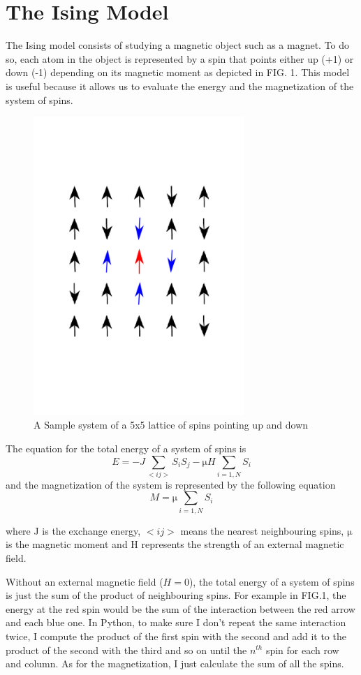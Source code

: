 \documentclass[aps,twocolumn,twoside,secnumarabic,balancelastpage,amsmath,amssymb,nofootinbib,hyperref=pdftex]{revtex4}
\begin{document}
\section{The Ising Model}
The Ising model consists of studying a magnetic object such as a magnet. To do so, each atom in the object is represented by a spin that points either up (+1) or down (-1) depending on its magnetic moment as depicted in FIG. 1. This model is useful because it allows us to evaluate the energy and the magnetization of the system of spins.
\begin{figure}[htb]
\includegraphics[width=8cm]{myspins.png}	
\caption{ A Sample system of a 5x5 lattice of spins pointing up and down}
\end{figure}

The equation for the total energy of a system of spins is 
\begin{equation}
   E= -J\sum_{<ij>} S_i S_j - \si\micro H \sum_{i=1,N} S_i
\end{equation}
and the magnetization of the system is represented by the following equation
\begin{equation}
   M= \si\micro \sum_{i=1,N} S_i
\end{equation}

where J is the exchange energy, $<ij>$ means the nearest neighbouring spins, $\si\micro$ is the magnetic moment and H represents the strength of an external magnetic field.
\par Without an external magnetic field ($H=0$), the total energy of a system of spins is just the sum of the product of neighbouring spins. For example in FIG.1, the energy at the red spin would be the sum of the interaction between the red arrow and each blue one. In Python, to make sure I don't repeat the same interaction twice, I compute the product of the first spin with the second and add it to the product of the second with the third and so on until the $n^{th}$ spin for each row and column. As for the magnetization, I just calculate the sum of all the spins. 
\end{document}
